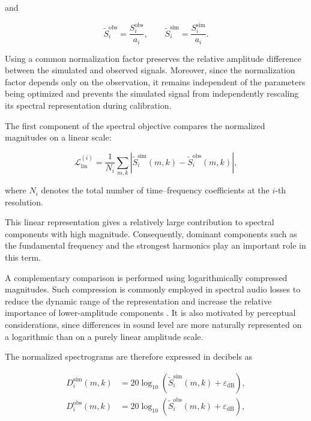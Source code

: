 \documentclass[11pt,a4paper]{report}
\theoremstyle{plain}
\theoremstyle{definition}
\begin{document}
and

\begin{equation}
\widetilde{S}_i^{\mathrm{obs}}
=
\frac{S_i^{\mathrm{obs}}}{a_i},
\qquad
\widetilde{S}_i^{\mathrm{sim}}
=
\frac{S_i^{\mathrm{sim}}}{a_i}.
\label{eq:normalized_target_predicted_spectrograms}
\end{equation}

Using a common normalization factor preserves the relative amplitude
difference between the simulated and observed signals. Moreover, since the
normalization factor depends only on the observation, it remains independent
of the parameters being optimized and prevents the simulated signal from
independently rescaling its spectral representation during calibration.

The first component of the spectral objective compares the normalized
magnitudes on a linear scale:

\begin{equation}
\mathcal{L}_{\mathrm{lin}}^{(i)}
=
\frac{1}{N_i}
\sum_{m,k}
\left|
\widetilde{S}_i^{\mathrm{sim}}(m,k)
-
\widetilde{S}_i^{\mathrm{obs}}(m,k)
\right|,
\label{eq:magnitude_loss}
\end{equation}

where \(N_i\) denotes the total number of time--frequency coefficients at the
\(i\)-th resolution.

This linear representation gives a relatively large contribution to spectral
components with high magnitude. Consequently, dominant components such as the
fundamental frequency and the strongest harmonics play an important role in
this term.

A complementary comparison is performed using logarithmically compressed
magnitudes. Such compression is commonly employed in spectral audio losses to
reduce the dynamic range of the representation and increase the relative
importance of lower-amplitude components \cite{schwaer2023multi}. It is
also motivated by perceptual considerations, since differences in sound level
are more naturally represented on a logarithmic than on a purely linear
amplitude scale.

The normalized spectrograms are therefore expressed in decibels as

\begin{align}
D_i^{\mathrm{sim}}(m,k)
&=
20\log_{10}
\left(
\widetilde{S}_i^{\mathrm{sim}}(m,k)
+
\varepsilon_{\mathrm{dB}}
\right),
\\
D_i^{\mathrm{obs}}(m,k)
&=
20\log_{10}
\left(
\widetilde{S}_i^{\mathrm{obs}}(m,k)
+
\varepsilon_{\mathrm{dB}}
\right),
\end{align}
\end{document}
